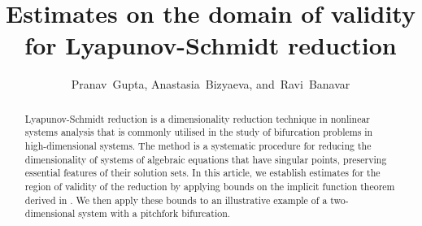 \documentclass[letterpaper, 10 pt, conference, dvipsnames]{ieeeconf}
\title{\LARGE \bf Estimates on the domain of validity for Lyapunov-Schmidt reduction}
\author{Pranav~Gupta,
        Anastasia~Bizyaeva,
        and~Ravi~Banavar
}
\begin{document}
\maketitle
\thispagestyle{empty}
\pagestyle{empty}


\begin{abstract}
    Lyapunov-Schmidt reduction is a dimensionality reduction technique in nonlinear systems analysis that is commonly utilised in the study of bifurcation problems in high-dimensional systems. The method is a systematic procedure for reducing the dimensionality of systems of algebraic equations that have singular points, preserving essential features of their solution sets. In this article, we establish estimates for the region of validity of the reduction by applying bounds on the implicit function theorem derived in \cite{jindal2023imft}. We then apply these bounds to an illustrative example of a two-dimensional system with a pitchfork bifurcation.
\end{abstract}

\end{document}
